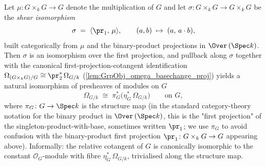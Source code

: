 \begin{lemma}
  \notready
  Let \(\mu \colon G \times_{k} G \to G\) denote the multiplication of \(G\) and let \(\sigma \colon G \times_{k} G \to G \times_{k} G\) be the \emph{shear isomorphism}
  \[
    \sigma \;=\; \langle \pr_{1},\, \mu \rangle, \qquad (a, b) \;\mapsto\; (a,\, a \cdot b),
  \]
  built categorically from \(\mu\) and the binary-product projections in \(\Over\,(\Spec k)\). Then \(\sigma\) is an isomorphism over the first projection, and pullback along \(\sigma\) together with the canonical first-projection-cotangent identification \(\Omega_{(G \times_{k} G)/G} \cong \pr_{2}^{*}\,\Omega_{G/k}\) (\cref{lem:GrpObj_omega_basechange_proj}) yields a natural isomorphism of presheaves of modules on \(G\)
  \[
    \Omega_{G/k} \;\cong\; \pi_{G}^{*}\!\bigl(\eta_{G}^{*}\,\Omega_{G/k}\bigr) \qquad \text{on } G,
  \]
  where \(\pi_{G} \colon G \to \Spec k\) is the structure map (in the standard category-theory notation for the binary product in \(\Over\,(\Spec k)\), this is the "first projection" of the singleton-product-with-base, sometimes written \(\pr_{1}\); we use \(\pi_{G}\) to avoid confusion with the binary-product first projection \(\pr_{1} \colon G \times_{k} G \to G\) appearing above). Informally: the relative cotangent of \(G\) is canonically isomorphic to the constant \(\mathcal O_{G}\)-module with fibre \(\eta_{G}^{*}\,\Omega_{G/k}\), trivialised along the structure map.


\end{lemma}
